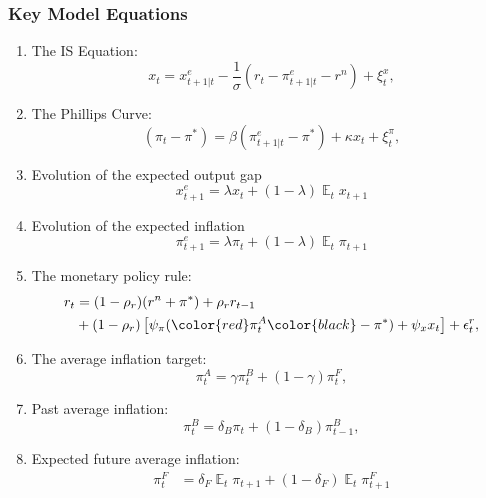 \documentclass{beamer}
\DeclareMathOperator{\E}{\mathbb{E}}
\begin{document}
\begin{frame}[allowframebreaks]
	\frametitle{Key Model Equations}
	\begin{enumerate}
		\item The IS Equation:
		\begin{equation*}
			x_t = x_{t+1|t}^e - \frac{1}{\sigma} \left( r_t - \pi_{t+1|t}^e  - r^n  \right) + \xi_t^{x},
		\end{equation*}
		\item The Phillips Curve: 
		\begin{equation*}
			(\pi_t - \pi^*) = \beta (\pi_{t+1|t}^e - \pi^*) + \kappa x_t + \xi_t^{\pi},
		\end{equation*}
		\item Evolution of the expected output gap
		\begin{equation*}
			x_{t+1}^e = \lambda x_t + (1-\lambda) \E_t x_{t+1}
		\end{equation*}
		\item Evolution of the expected inflation
		\begin{equation*}
			\pi_{t+1}^e = \lambda \pi_t + (1-\lambda) \E_t \pi_{t+1}
		\end{equation*}
		\item The monetary policy rule:
		\begin{align*}
			r_t &= (1-\rho_r)(r^n + \pi^*) + \rho_r r_{t-1} \nonumber \\
			& + (1-\rho_r) \left[ \psi_\pi (\color{red}\pi_t^A \color{black} - \pi^*) + \psi_x x_t \right] + \epsilon_t^{r},
		\end{align*}
		\item The average inflation target:
		\begin{equation*}
			\pi_t^A = \gamma \pi_t^B + (1-\gamma) \pi_t^F,
		\end{equation*}
		\item Past average inflation:
		\begin{equation*}
			\pi_t^B = \delta_B \pi_t + (1-\delta_B) \pi_{t-1}^B,
		\end{equation*}
		\item Expected future average inflation:
		\begin{align*}
			\pi_t^F &= \delta_F \E_t \pi_{t+1} + (1-\delta_F) \E_t \pi_{t+1}^F
		\end{align*}
	\end{enumerate}
\end{frame}
\end{document}
